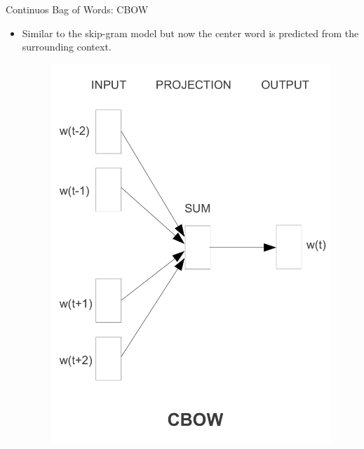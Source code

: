 \documentclass[handout]{beamer}
\begin{document}
\begin{frame}{Continuos Bag of Words: CBOW}
\begin{scriptsize}
\begin{itemize}
\item  Similar to the skip-gram model but now the center word is predicted from the surrounding context.
 \begin{figure}[h]
    	\includegraphics[scale = 0.55]{pics/CBOW.png}
    \end{figure}
       
        
\end{itemize}
\end{scriptsize}
\end{frame}
\end{document}
